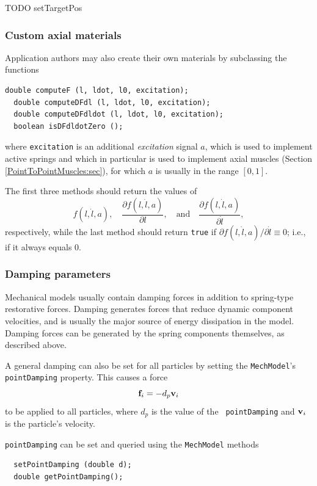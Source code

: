 TODO setTargetPos

\subsubsection{Custom axial materials}

Application authors may also create their
own materials by subclassing the functions
%
\begin{lstlisting}[]
  double computeF (l, ldot, l0, excitation);
  double computeDFdl (l, ldot, l0, excitation);
  double computeDFdldot (l, ldot, l0, excitation);
  boolean isDFdldotZero ();
\end{lstlisting}
%
where {\tt excitation} is an additional {\it excitation} signal $a$, which
is used to implement active springs and which in particular is used to
implement axial muscles (Section \ref{PointToPointMuscles:sec}), for
which $a$ is usually in the range $[0, 1]$.

The first three methods should return the values of 
%
\begin{equation}
f (l, \dot l, a), \quad
\frac{\partial f(l, \dot l, a)}{\partial l}, \quad \text{and} \quad
\frac{\partial f(l, \dot l, a)}{\partial \dot l},
\end{equation}
%
respectively, while the last method should return {\tt true} if
$\partial f(l, \dot l, a) / \partial \dot l \equiv 0$; i.e., if it always
equals 0.

\subsubsection{Damping parameters}

Mechanical models usually contain damping forces in addition to
spring-type restorative forces. Damping generates forces that reduce
dynamic component velocities, and is usually the major source of
energy dissipation in the model. Damping forces can be generated by
the spring components themselves, as described above.

A general damping can also be set for all particles by setting the
{\tt MechModel}'s {\tt pointDamping} property. This causes
a force
%
\begin{equation}
{\bf f}_i = -d_p {\bf v}_i
\end{equation}
%
to be applied to all particles, where $d_p$ is the value of the {\tt
pointDamping} and ${\bf v}_i$ is the particle's velocity.

{\tt pointDamping} can be set and queried using the {\tt MechModel}
methods
%
\begin{lstlisting}
  setPointDamping (double d);
  double getPointDamping();
\end{lstlisting}
%

